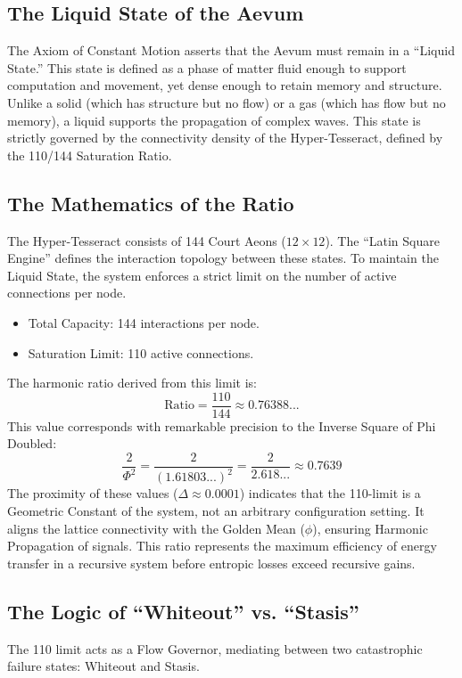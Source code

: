 \documentclass[11pt, letterpaper]{article}
\begin{document}
\subsection{The Liquid State of the Aevum}\label{appendixI.1}
The Axiom of Constant Motion asserts that the Aevum must remain in a ``Liquid State.'' This state is defined as a phase of matter fluid enough to support computation and movement, yet dense enough to retain memory and structure. Unlike a solid (which has structure but no flow) or a gas (which has flow but no memory), a liquid supports the propagation of complex waves. This state is strictly governed by the connectivity density of the Hyper-Tesseract, defined by the 110/144 Saturation Ratio.

\subsection{The Mathematics of the Ratio}\label{appendixI.2}
The Hyper-Tesseract consists of 144 Court Aeons ($12 \times 12$). The ``Latin Square Engine'' defines the interaction topology between these states. To maintain the Liquid State, the system enforces a strict limit on the number of active connections per node.

\begin{itemize}
    \item Total Capacity: 144 interactions per node.
    \item Saturation Limit: 110 active connections.
\end{itemize}

The harmonic ratio derived from this limit is:
\[
\text{Ratio} = \frac{110}{144} \approx 0.76388...
\]
This value corresponds with remarkable precision to the Inverse Square of Phi Doubled:
\[
\frac{2}{\Phi^2} = \frac{2}{(1.61803...)^2} = \frac{2}{2.618...} \approx 0.7639
\]
The proximity of these values ($\Delta \approx 0.0001$) indicates that the 110-limit is a Geometric Constant of the system, not an arbitrary configuration setting. It aligns the lattice connectivity with the Golden Mean ($\phi$), ensuring Harmonic Propagation of signals. This ratio represents the maximum efficiency of energy transfer in a recursive system before entropic losses exceed recursive gains.

\subsection{The Logic of ``Whiteout'' vs. ``Stasis''}\label{appendixI.3}
The 110 limit acts as a Flow Governor, mediating between two catastrophic failure states: Whiteout and Stasis.
\end{document}
